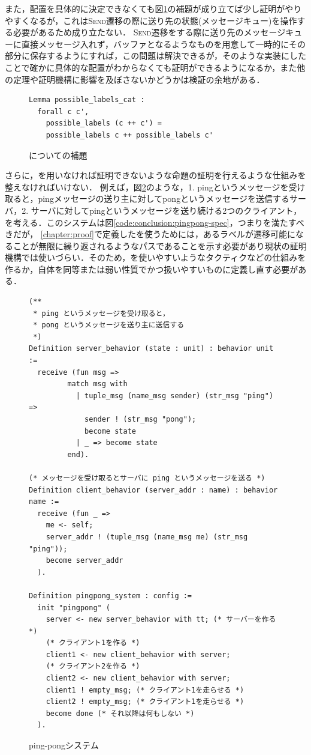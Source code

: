 また，配置を具体的に決定できなくても図\ref{code:conclusion:possible-labels-cat}の補題が成り立てば少し証明がやりやすくなるが，これは\textsc{Send}遷移の際に送り先の状態(メッセージキュー)を操作する必要があるため成り立たない．
\textsc{Send}遷移をする際に送り先のメッセージキューに直接メッセージ入れず，バッファとなるようなものを用意して一時的にその部分に保存するようにすれば，この問題は解決できるが，そのような実装にしたことで確かに具体的な配置がわからなくても証明ができるようになるか，また他の定理や証明機構に影響を及ぼさないかどうかは検証の余地がある．


\begin{figure}[tp]
\begin{lstlisting}
Lemma possible_labels_cat :
  forall c c',
    possible_labels (c ++ c') =
    possible_labels c ++ possible_labels c'
\end{lstlisting}
\label{code:conclusion:possible-labels-cat}
\caption{についての補題}
\end{figure}


さらに，\fairness を用いなければ証明できないような命題の証明を行えるような仕組みを整えなければいけない．
例えば，図\ref{code:conclusion:pingpong}のような，1. pingというメッセージを受け取ると，pingメッセージの送り主に対してpongというメッセージを送信するサーバ，2. サーバに対してpingというメッセージを送り続ける2つのクライアント，を考える．このシステムは図\ref{code:conclusion:pingpong-spec}，つまりを満たすべきだが，
\ref{chapter:proof}で定義したを使うためには，あるラベルが遷移可能になることが無限に繰り返されるようなパスであることを示す必要があり現状の証明機構では使いづらい．そのため，を使いやすいようなタクティクなどの仕組みを作るか，自体を同等または弱い性質でかつ扱いやすいものに定義し直す必要がある．

\begin{figure}[tp]
\begin{lstlisting}
(**
 * ping というメッセージを受け取ると，
 * pong というメッセージを送り主に送信する
 *)
Definition server_behavior (state : unit) : behavior unit :=
  receive (fun msg =>
         match msg with
           | tuple_msg (name_msg sender) (str_msg "ping") =>
             sender ! (str_msg "pong");
             become state
           | _ => become state
         end).

(* メッセージを受け取るとサーバに ping というメッセージを送る *)
Definition client_behavior (server_addr : name) : behavior name :=
  receive (fun _ =>
    me <- self;
    server_addr ! (tuple_msg (name_msg me) (str_msg "ping"));
    become server_addr
  ).

Definition pingpong_system : config :=
  init "pingpong" (
    server <- new server_behavior with tt; (* サーバーを作る *)
    (* クライアント1を作る *)
    client1 <- new client_behavior with server;
    (* クライアント2を作る *)
    client2 <- new client_behavior with server;
    client1 ! empty_msg; (* クライアント1を走らせる *)
    client2 ! empty_msg; (* クライアント1を走らせる *)
    become done (* それ以降は何もしない *)
  ).
\end{lstlisting}
  \label{code:conclusion:pingpong}
  \caption{ping-pongシステム}
\end{figure}

